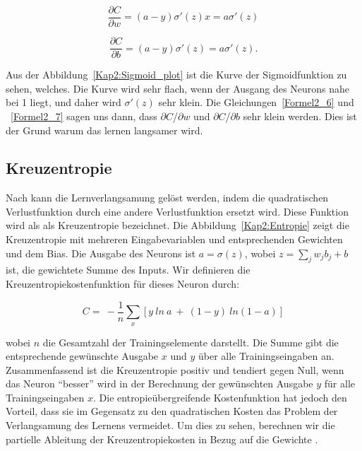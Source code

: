     \begin{equation} \label{Formel2_6}
      \frac{\partial C}{\partial w} =( a-y) \sigma '( z) x=a\sigma '( z)
    \end{equation}

    \begin{equation} \label{Formel2_7}
      \frac{\partial C}{\partial b} =( a-y) \sigma '( z) =a\sigma '( z).
    \end{equation}

    Aus der Abbildung~\ref{Kap2:Sigmoid_plot} ist die Kurve der Sigmoidfunktion zu sehen, welches. Die Kurve wird sehr flach, wenn der Ausgang des Neurons nahe bei 1 liegt, und daher wird $\sigma'(z)$ sehr klein. Die Gleichungen~\ref{Formel2_6} und ~\ref{Formel2_7} sagen uns dann, dass $\partial$$C$/$\partial$$w$  und  $\partial$$C$/$\partial$$b$ sehr klein werden. Dies ist der Grund warum das lernen langsamer wird.

  \subsection{Kreuzentropie}
  Nach \cite*[62]{Nielsen2015} kann die Lernverlangsamung gelöst werden, indem die quadratischen Verlustfunktion durch eine andere Verlustfunktion ersetzt wird. Diese Funktion wird als als Kreuzentropie bezeichnet. Die Abbildung~\ref{Kap2:Entropie} zeigt die Kreuzentropie mit mehreren Eingabevariablen und entsprechenden Gewichten und dem Bias. Die Ausgabe des Neurons ist $a = \sigma(z)$, wobei $z =  \sum _{j} w_{j} b_{j} + b$ ist, die gewichtete Summe des Inputs. Wir definieren die Kreuzentropiekostenfunktion für dieses Neuron durch:

  \begin{equation} \label{Formel2_8}
    C=\ -\frac{1}{n}\sum _{x}[ y\ ln\ a\ +\ ( 1-y) \ ln( 1-a)]
  \end{equation}

  wobei $n$ die Gesamtzahl der Trainingselemente darstellt. Die Summe gibt die entsprechende gewünschte Ausgabe $x$ und $y$ über alle Trainingseingaben an. Zusammenfassend ist die Kreuzentropie positiv und tendiert gegen Null, wenn das Neuron
  \enquote{besser} wird in der Berechnung der gewünschten Ausgabe $y$ für alle Trainingseingaben $x$.  Die entropieübergreifende Kostenfunktion hat jedoch den Vorteil, dass sie im Gegensatz zu den quadratischen Kosten das Problem der Verlangsamung des Lernens vermeidet. Um dies zu sehen, berechnen wir die partielle Ableitung der Kreuzentropiekosten in Bezug auf die Gewichte \cite*[63]{Nielsen2015}.

